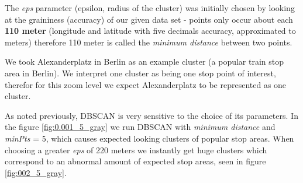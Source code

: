The \textit{eps} parameter (epsilon, radius of the cluster) was initially chosen by looking at the graininess (accuracy) of our given data set - points only occur about each \textbf{110 meter} (longitude and latitude with five decimals accuracy, approximated to meters) therefore 110 meter is called the \textit{minimum distance} between two points.  

We took Alexanderplatz in Berlin as an example cluster (a popular train stop area in Berlin). We interpret one cluster as being one stop point of interest, therefor for this zoom level we expect Alexanderplatz to be represented as one cluster. 

As noted previously, DBSCAN is very sensitive to the choice of its parameters. In the figure \ref{fig:0.001_5_gray} we run DBSCAN with \textit{minimum distance}  and \textit{minPts} = 5, which causes expected looking clusters of popular stop areas. When choosing a greater \textit{eps} of 220 meters we instantly get huge clusters which correspond to an abnormal amount of expected stop areas, seen in figure \ref{fig:002_5_gray}. 

